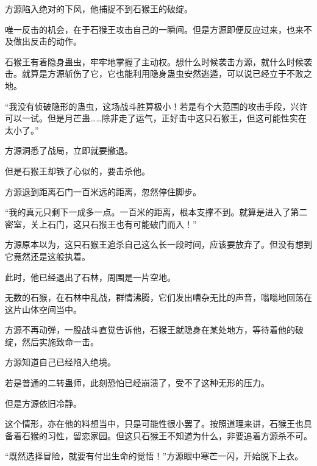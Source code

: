 \begin{this_body}
方源陷入绝对的下风，他捕捉不到石猴王的破绽。

唯一反击的机会，在于石猴王攻击自己的一瞬间。但是方源即便反应过来，也来不及做出反击的动作。

石猴王有着隐身蛊虫，牢牢地掌握了主动权。想什么时候袭击方源，就什么时候袭击。就算是方源斩伤了它，它也能利用隐身蛊虫安然逃遁，可以说已经立于不败之地。

“我没有侦破隐形的蛊虫，这场战斗胜算极小！若是有个大范围的攻击手段，兴许可以一试。但是月芒蛊……除非走了运气，正好击中这只石猴王，但这可能性实在太小了。”

方源洞悉了战局，立即就要撤退。

但是石猴王却铁了心似的，要击杀他。

方源退到距离石门一百米远的距离，忽然停住脚步。

“我的真元只剩下一成多一点。一百米的距离，根本支撑不到。就算是进入了第二密室，关上石门，这只石猴王也有可能破门而入！”

方源原本以为，这只石猴王追杀自己这么长一段时间，应该要放弃了。但没有想到它竟然还是这般执着。

此时，他已经退出了石林，周围是一片空地。

无数的石猴，在石林中乱战，群情沸腾，它们发出嘈杂无比的声音，嗡嗡地回荡在这片山体空间当中。

方源不再动弹，一股战斗直觉告诉他，石猴王就隐身在某处地方，等待着他的破绽，然后实施致命一击。

方源知道自己已经陷入绝境。

若是普通的二转蛊师，此刻恐怕已经崩溃了，受不了这种无形的压力。

但是方源依旧冷静。

这个情形，亦在他的料想当中，只是可能性很小罢了。按照道理来讲，石猴王也具备着石猴的习性，留恋家园。但这只石猴王不知道为什么，非要追着方源杀不可。

“既然选择冒险，就要有付出生命的觉悟！”方源眼中寒芒一闪，开始脱下上衣。

\end{this_body}

